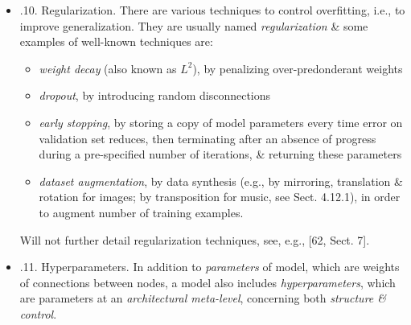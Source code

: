 \documentclass{article}
\begin{document}
\begin{itemize}
\begin{itemize}
\begin{itemize}
			In order to be able to estimate potential for generalization, dataset is actually divided into 2 portions, with a ratio of $\approx70/30$:
			\begin{itemize}
				\item {\it training set} -- which will be used for training neural network
				\item {\it validation set}, also named {\it test set}\footnote{Actually, a difference could (should) be made, as explained by Hastie et al. in [72, p. 222]: ``It is important to note: there are in fact 2 separate goals that might have in mid:
					\begin{enumerate}
						\item Model selection: estimating performance of different models in order to choose best one.
						\item Model assessment: having chosen a final model, estimating its prediction error (generalization error) on new data.
					\end{enumerate}
					If we are in a data-rich situation, best approach for both problems is to randomly divided dataset into 3 parts: a training set, a validation set, \& a test set. Training set is used to fit models; validation set is used to estimate prediction error for model selection; test set is used for assessment of generalization error of final chosen model.'' However, as a matter of simplification, will not consider that difference in book.} -- which will be used to estimate capacity of model for generalization.
			\end{itemize}
			\item {.10. Regularization.} There are various techniques to control overfitting, i.e., to improve generalization. They are usually named {\it regularization} \& some examples of well-known techniques are:
			\begin{itemize}
				\item {\it weight decay} (also known as $L^2$), by penalizing over-predonderant weights
				\item {\it dropout}, by introducing random disconnections
				\item {\it early stopping}, by storing a copy of model parameters every time error on validation set reduces, then terminating after an absence of progress during a pre-specified number of iterations, \& returning these parameters
				\item {\it dataset augmentation}, by data synthesis (e.g., by mirroring, translation \& rotation for images; by transposition for music, see Sect. 4.12.1), in order to augment number of training examples.
			\end{itemize}
			Will not further detail regularization techniques, see, e.g., [62, Sect. 7].
			\item {.11. Hyperparameters.} In addition to {\it parameters} of model, which are weights of connections between nodes, a model also includes {\it hyperparameters}, which are parameters at an {\it architectural meta-level}, concerning both {\it structure \& control}.


\end{itemize}
\end{itemize}
\end{itemize}
\end{document}

